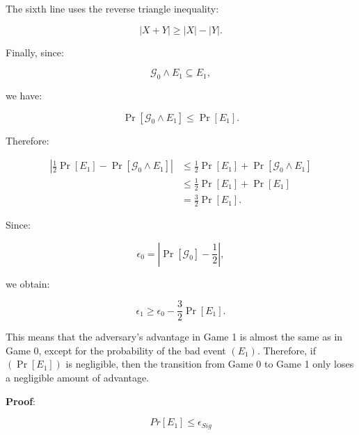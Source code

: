 \documentclass[
]{article}
\begin{document}
The sixth line uses the reverse triangle inequality:

\[
|X+Y|\ge |X|-|Y|.
\]

Finally, since:

\[
\mathcal{G}_0\wedge E_1 \subseteq E_1,
\]

we have:

\[
\Pr[\mathcal{G}_0\wedge E_1]\le \Pr[E_1].
\]

Therefore:

\[
\begin{aligned}
\left|
\frac{1}{2}\Pr[E_1]
-
\Pr[\mathcal{G}_0\wedge E_1]
\right|
&\le
\frac{1}{2}\Pr[E_1]
+
\Pr[\mathcal{G}_0\wedge E_1] \\[1mm]
&\le
\frac{1}{2}\Pr[E_1]+\Pr[E_1] \\[1mm]
&=
\frac{3}{2}\Pr[E_1].
\end{aligned}
\]

Since:

\[
\epsilon_0
=
\left|\Pr[\mathcal{G}_0]-\frac{1}{2}\right|,
\]

we obtain:

\[
\boxed{
\epsilon_1
\ge
\epsilon_0
-
\frac{3}{2}\Pr[E_1].
}
\]

This means that the adversary's advantage in Game 1 is almost the same
as in Game 0, except for the probability of the bad event \((E_1)\).
Therefore, if \((\Pr[E_1])\) is negligible, then the transition from
Game 0 to Game 1 only loses a negligible amount of advantage.

\textbf{Proof}:

\[
Pr[E_1] \le \epsilon_{Sig}
\]
\end{document}
